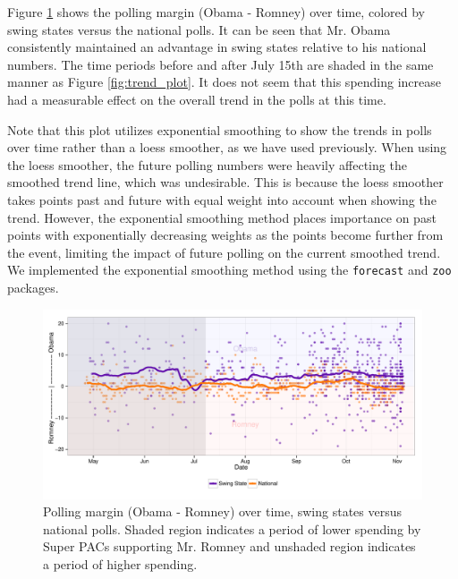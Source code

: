 \documentclass[11pt]{article}\usepackage{graphicx, color}
\newenvironment{knitrout}{}{} %
\begin{document}
Figure \ref{fig:effect_plot} shows the polling margin (Obama - Romney) over time, colored by swing states versus the national polls. It can be seen that Mr. Obama consistently maintained an advantage in swing states relative to his national numbers. The time periods before and after July 15th are shaded in the same manner as Figure \ref{fig:trend_plot}. It does not seem that this spending increase had a measurable effect on the overall trend in the polls at this time.

Note that this plot utilizes exponential smoothing to show the trends in polls over time rather than a loess smoother, as we have used previously. When using the loess smoother, the future polling numbers were heavily affecting the smoothed trend line, which was undesirable. This is because the loess smoother takes points past and future with equal weight into account when showing the trend. However, the exponential smoothing method places importance on past points with exponentially decreasing weights as the points become further from the event, limiting the impact of future polling on the current smoothed trend. We implemented the exponential smoothing method using the \texttt{forecast} and \texttt{zoo} packages.

\begin{knitrout}
\color{fgcolor}\begin{figure}[H]


{\centering \includegraphics[width=\textwidth]{figure/effect_plot} 

}

\caption[Polling margin (Obama - Romney) over time, swing states versus national polls]{Polling margin (Obama - Romney) over time, swing states versus national polls. Shaded region indicates a period of lower spending by Super PACs supporting Mr. Romney and unshaded region indicates a period of higher spending.\label{fig:effect_plot}}
\end{figure}


\end{knitrout}
\end{document}
